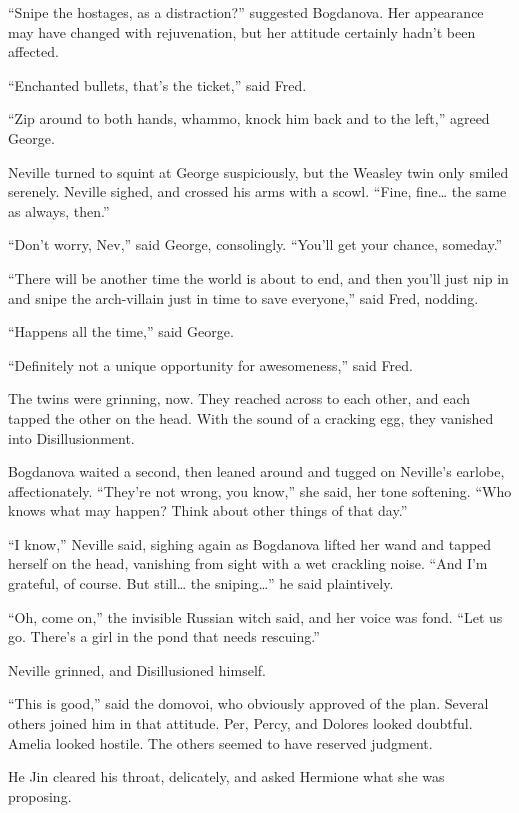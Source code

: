 ``Snipe the hostages, as a distraction?'' suggested Bogdanova. Her
appearance may have changed with rejuvenation, but her attitude
certainly hadn't been affected.

``Enchanted bullets, that's the ticket,'' said Fred.

``Zip around to both hands, whammo, knock him back and to the left,''
agreed George.

Neville turned to squint at George suspiciously, but the Weasley twin
only smiled serenely. Neville sighed, and crossed his arms with a scowl.
``Fine, fine\ldots{} the same as always, then.''

``Don't worry, Nev,'' said George, consolingly. ``You'll get your
chance, someday.''

``There will be another time the world is about to end, and then you'll
just nip in and snipe the arch-villain just in time to save everyone,''
said Fred, nodding.

``Happens all the time,'' said George.

``Definitely not a unique opportunity for awesomeness,'' said Fred.

The twins were grinning, now. They reached across to each other, and
each tapped the other on the head. With the sound of a cracking egg,
they vanished into Disillusionment.

Bogdanova waited a second, then leaned around and tugged on Neville's
earlobe, affectionately. ``They're not wrong, you know,'' she said, her
tone softening. ``Who knows what may happen? Think about other things of
that day.''

``I know,'' Neville said, sighing again as Bogdanova lifted her wand and
tapped herself on the head, vanishing from sight with a wet crackling
noise. ``And I'm grateful, of course. But still\ldots{} the
sniping\ldots{}'' he said plaintively.

``Oh, come on,'' the invisible Russian witch said, and her voice was
fond. ``Let us go. There's a girl in the pond that needs rescuing.''

Neville grinned, and Disillusioned himself.

\mybreak

``This is good,'' said the domovoi, who obviously approved of the plan.
Several others joined him in that attitude. Per, Percy, and Dolores
looked doubtful. Amelia looked hostile. The others seemed to have
reserved judgment.

He Jin cleared his throat, delicately, and asked Hermione what she was
proposing.

